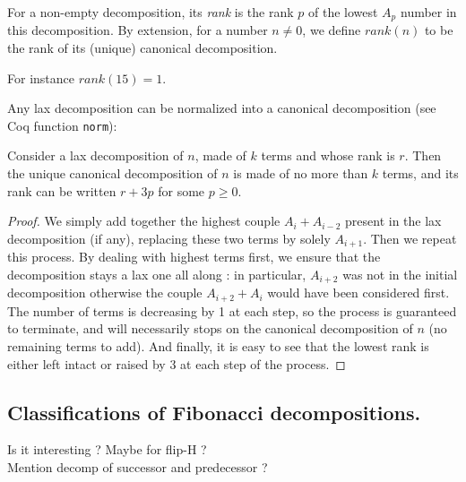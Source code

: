 \documentclass[a4paper,11pt]{article}
\begin{document}
\begin{definition}
For a non-empty decomposition, its \emph{rank} is the rank $p$ of
the lowest $A_p$ number in this decomposition. By extension, for a
number $n\neq 0$, we define $rank(n)$ to be the rank of its (unique)
canonical decomposition.
\end{definition}
For instance $rank(15)=1$.

Any lax decomposition can be normalized into a canonical decomposition
(see Coq function {\tt norm}):

\begin{theorem}[normalization]\label{norm}
Consider a lax decomposition of $n$, made of $k$ terms and
whose rank is $r$. Then the unique canonical decomposition
of $n$ is made of no more than $k$ terms, and its rank can
be written $r+3p$ for some $p\ge 0$.
\end{theorem}
\begin{proof}
We simply add together the highest couple $A_i + A_{i-2}$ present in
the lax decomposition (if any), replacing these two terms by
solely $A_{i+1}$. Then we repeat this process.
By dealing with highest terms first, we ensure that the decomposition
stays a lax one all along : in particular, $A_{i+2}$ was not in
the initial decomposition otherwise the couple $A_{i+2} + A_{i}$ would have
been considered first. The number of
terms is decreasing by 1 at each step, so the process is guaranteed to
terminate, and will necessarily stops on the canonical decomposition
of $n$ (no remaining terms to add).
And finally, it is easy to see that the
lowest rank is either left intact or raised by 3 at each step of the process.
\end{proof}

\subsection{Classifications of Fibonacci decompositions.}

\TODO Is it interesting ? Maybe for flip-H ? \\
\TODO Mention decomp of successor and predecessor ?
\end{document}
